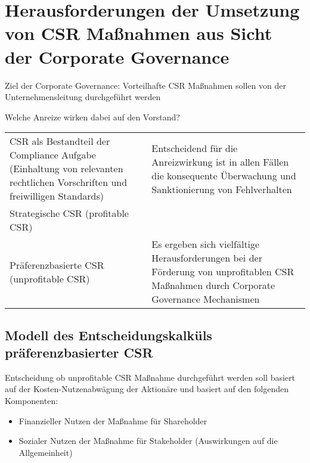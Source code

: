 \documentclass[
]{article}
\providecommand{\tightlist}{%
  \setlength{\itemsep}{0pt}\setlength{\parskip}{0pt}}
\begin{document}
\hypertarget{herausforderungen-der-umsetzung-von-csr-mauxdfnahmen-aus-sicht-der-corporate-governance}{%
\section{Herausforderungen der Umsetzung von CSR Maßnahmen aus Sicht der
Corporate
Governance}\label{herausforderungen-der-umsetzung-von-csr-mauxdfnahmen-aus-sicht-der-corporate-governance}}

Ziel der Corporate Governance: Vorteilhafte CSR Maßnahmen sollen von der
Unternehmensleitung durchgeführt werden

Welche Anreize wirken dabei auf den Vorstand?

\begin{longtable}[]{@{}
  >{\raggedright\arraybackslash}p{}
  >{\raggedright\arraybackslash}p{}@{}}
\toprule
\endhead
CSR als Bestandteil der Compliance Aufgabe (Einhaltung von relevanten
rechtlichen Vorschriften und freiwilligen Standards) & Entscheidend für
die Anreizwirkung ist in allen Fällen die konsequente Überwachung und
Sanktionierung von Fehlverhalten \\
Strategische CSR (profitable CSR) & \\
Präferenzbasierte CSR (unprofitable CSR) & Es ergeben sich vielfältige
Herausforderungen bei der Förderung von unprofitablen CSR Maßnahmen
durch Corporate Governance Mechanismen \\
\bottomrule
\end{longtable}

\hypertarget{modell-des-entscheidungskalkuxfcls-pruxe4ferenzbasierter-csr}{%
\subsection{Modell des Entscheidungskalküls präferenzbasierter
CSR}\label{modell-des-entscheidungskalkuxfcls-pruxe4ferenzbasierter-csr}}

Entscheidung ob unprofitable CSR Maßnahme durchgeführt werden soll
basiert auf der Kosten-Nutzenabwägung der Aktionäre und basiert auf den
folgenden Komponenten:

\begin{itemize}
\tightlist
\item
  Finanzieller Nutzen der Maßnahme für Shareholder
\item
  Sozialer Nutzen der Maßnahme für Stakeholder (Auswirkungen auf die
  Allgemeinheit)
\end{itemize}
\end{document}
